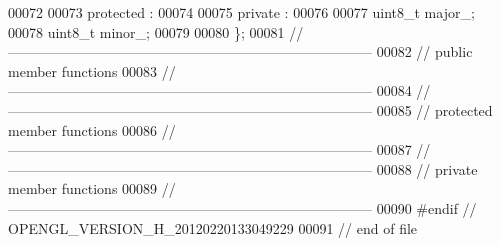 \begin{DoxyCode}
00072 
00073 \textcolor{keyword}{protected} :
00074 
00075 \textcolor{keyword}{private} :
00076 
00077     uint8\_t     major\_;
00078     uint8\_t     minor\_;
00079 
00080 \};
00081 \textcolor{comment}{//
      ------------------------------------------------------------------------------}
00082 \textcolor{comment}{// public member functions}
00083 \textcolor{comment}{//
      ------------------------------------------------------------------------------}
00084 \textcolor{comment}{//
      ------------------------------------------------------------------------------}
00085 \textcolor{comment}{// protected member functions}
00086 \textcolor{comment}{//
      ------------------------------------------------------------------------------}
00087 \textcolor{comment}{//
      ------------------------------------------------------------------------------}
00088 \textcolor{comment}{// private member functions}
00089 \textcolor{comment}{//
      ------------------------------------------------------------------------------}
00090 \textcolor{preprocessor}{#endif // OPENGL\_VERSION\_H\_20120220133049229}
00091 \textcolor{preprocessor}{}\textcolor{comment}{// end of file}
\end{DoxyCode}
